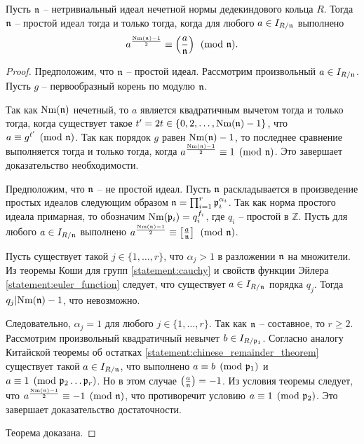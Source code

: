 \documentclass[_00_dissertation.tex]{subfiles}
\begin{document}
\begin{theorem}\label{theorem:euler_criteria}
    Пусть $\mathfrak{n}$ -- нетривиальный идеал нечетной нормы дедекиндового кольца $R$.
    Тогда $\mathfrak{n}$ -- простой идеал тогда и только тогда, когда для любого $a \in I_{R/\mathfrak{n}}$ выполнено
    \begin{equation*}
        a^{\frac{\textrm{Nm}(\mathfrak{n}) - 1}{2}} \equiv \left(\frac{a}{\mathfrak{n}}\right) \pmod{\mathfrak{n}}.
    \end{equation*}
\end{theorem}
\begin{proof}
    Предположим, что $\mathfrak{n}$ -- простой идеал.
    Рассмотрим произвольный $a \in I_{R/\mathfrak{n}}$.
    Пусть $g$ -- первообразный корень по модулю $\mathfrak{n}$.

    Так как $\textrm{Nm}(\mathfrak{n})$ нечетный, то $a$ является квадратичным вычетом тогда и только тогда, когда существует такое $t' = 2t \in \{0, 2, \dots, \textrm{Nm}(\mathfrak{n}) - 1\}$, что $a \equiv g^{t'} \pmod{\mathfrak{n}}$.
    Так как порядок $g$ равен $\textrm{Nm}(\mathfrak{n}) - 1$, то последнее сравнение выполняется тогда и только тогда, когда $a^{\frac{\textrm{Nm}(\mathfrak{n}) - 1}{2}} \equiv 1 \pmod{\mathfrak{n}}$.
    Это завершает доказательство необходимости.

    Предположим, что $\mathfrak{n}$ -- не простой идеал.
    Пусть $\mathfrak{n}$ раскладывается в произведение простых идеалов следующим образом $\mathfrak{n} = \prod_{i=1}^{r} \mathfrak{p}_i^{\alpha_i}$.
    Так как норма простого идеала примарная, то обозначим $\textrm{Nm}(\mathfrak{p}_i) = q_i^{f_i}$, где $q_i$ -- простой в $\mathbb{Z}$.
    Пусть для любого $a \in I_{R/\mathfrak{n}}$ выполнено $a^{\frac{\textrm{Nm}(\mathfrak{n}) - 1}{2}} \equiv \left[\frac{a}{\mathfrak{n}}\right] \pmod{\mathfrak{n}}$.

    Пусть существует такой $j \in \{1, \dots, r\}$, что $\alpha_j > 1$ в разложении $\mathfrak{n}$ на множители.
    Из теоремы Коши для групп \ref{statement:cauchy} и свойств функции Эйлера \ref{statement:euler_function} следует, что существует $a \in I_{R/\mathfrak{n}}$ порядка $q_j$.
    Тогда $q_j | \textrm{Nm}(\mathfrak{n}) - 1$, что невозможно.

    Следовательно, $\alpha_j = 1$ для любого $j \in \{1, \ldots, r\}$.
    Так как $\mathfrak{n}$ -- составное, то $r \ge 2$.
    Рассмотрим произвольный квадратичный невычет $b \in I_{R/\mathfrak{p}_1}$.
    Согласно аналогу Китайской теоремы об остатках \ref{statement:chinese_remainder_theorem} существует такой $a \in I_{R/\mathfrak{n}}$, что выполнено $a \equiv b \pmod{\mathfrak{p}_1}$ и $a \equiv 1 \pmod{\mathfrak{p}_2\dots\mathfrak{p}_r}$.
    Но в этом случае $\left(\frac{a}{\mathfrak{n}}\right) = -1$.
    Из условия теоремы следует, что $a^{\frac{\textrm{Nm}(\mathfrak{n}) - 1}{2}} \equiv -1 \pmod{\mathfrak{n}}$, что противоречит условию $a \equiv 1 \pmod{\mathfrak{p}_2}$.
    Это завершает доказательство достаточности.

    Теорема доказана.
\end{proof}
\end{document}

